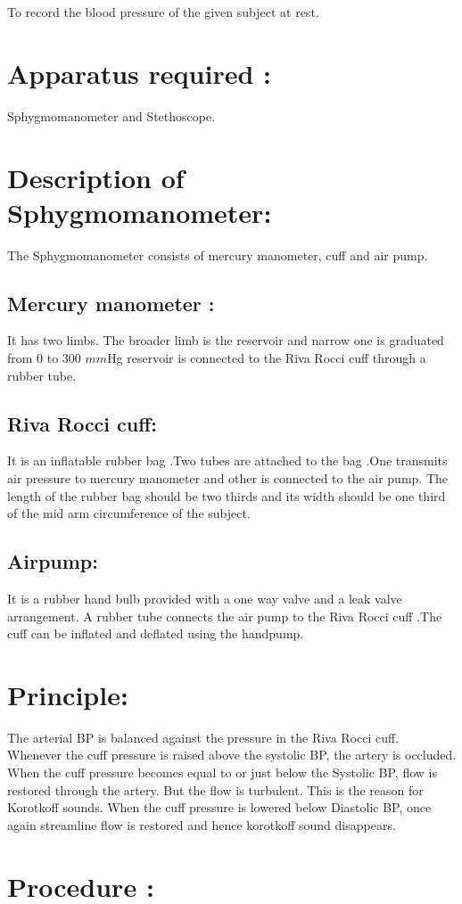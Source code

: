 \documentclass[a4paper,12pt,openany,oneside]{book}
\begin{document}
To record the blood pressure of the given subject at rest.
\section*{Apparatus required :}
Sphygmomanometer and Stethoscope.
\section*{Description of Sphygmomanometer:}
The Sphygmomanometer consists of mercury manometer, cuff and air pump.
\subsection*{Mercury manometer :} It has two limbs. The broader limb is the reservoir and narrow one is graduated from 0 to 300 $mm$Hg reservoir is connected to the Riva Rocci cuff through a rubber tube.
\subsection*{Riva Rocci cuff:} It is an inflatable rubber bag .Two tubes are attached to the bag .One transmits air pressure to mercury manometer and other is connected to the air pump. The length of the rubber bag should be two thirds and its width should be one third of the mid arm circumference of the subject.
\subsection*{Airpump:} It is a rubber hand bulb provided with a one way valve and a leak valve arrangement. A rubber tube connects the air pump to the Riva Rocci cuff .The cuff can be inflated and deflated using the handpump.
\section*{Principle:}
The arterial BP is balanced against the pressure in the Riva Rocci cuff. Whenever the cuff pressure is raised above the systolic BP, the artery is occluded. When the cuff pressure becomes equal to or just below the Systolic BP, flow is restored through the artery. But the flow is turbulent. This is the reason for Korotkoff sounds. When the cuff pressure is lowered below Diastolic BP, once again streamline flow is restored and hence korotkoff sound disappears.
\section*{Procedure :}
\end{document}
